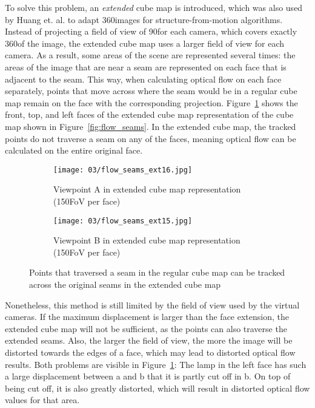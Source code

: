 To solve this problem, an \emph{extended} cube map is introduced, which was also used by Huang et. al. \cite{6dof} to adapt 360\degree images for structure-from-motion algorithms. Instead of projecting a field of view of 90\degree for each camera, which covers exactly 360\degree of the image, the extended cube map uses a larger field of view for each camera. As a result, some areas of the scene are represented several times: the areas of the image that are near a seam are represented on each face that is adjacent to the seam. This way, when calculating optical flow on each face separately, points that move across where the seam would be in a regular cube map remain on the face with the corresponding projection. Figure~\ref{fig:flow_seams_ext} shows the front, top, and left faces of the extended cube map representation of the cube map shown in Figure~\ref{fig:flow_seams}. In the extended cube map, the tracked points do not traverse a seam on any of the faces, meaning optical flow can be calculated on the entire original face.

\begin{figure}
\centering
    \hfill
    \begin{subfigure}[t]{0.5\textwidth}            
            \centering
            \texttt{[image: 03/flow\_seams\_ext16.jpg]}
            \caption{Viewpoint A in extended cube map representation (150\degree FoV per face)}
    \end{subfigure}%
    \hfill
    \begin{subfigure}[t]{0.5\textwidth}
            \centering
            \texttt{[image: 03/flow\_seams\_ext15.jpg]}
            \caption{Viewpoint B in extended cube map representation (150\degree FoV per face)}
    \end{subfigure}
    \hfill
    \hfill
  \caption[Tracking points across seams in the extended cube map]{Points that traversed a seam in the regular cube map can be tracked across the original seams in the extended cube map} \label{fig:flow_seams_ext}
\end{figure}

Nonetheless, this method is still limited by the field of view used by the virtual cameras. If the maximum displacement is larger than the face extension, the extended cube map will not be sufficient, as the points can also traverse the extended seams. Also, the larger the field of view, the more the image will be distorted towards the edges of a face, which may lead to distorted optical flow results. Both problems are visible in Figure~\ref{fig:flow_seams_ext}: The lamp in the left face has such a large displacement between a and b that it is partly cut off in b. On top of being cut off, it is also greatly distorted, which will result in distorted optical flow values for that area.

